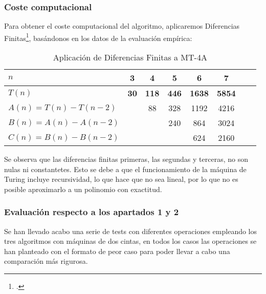 \subsubsection*{Coste computacional}
Para obtener el coste computacional del algoritmo, aplicaremos Diferencias Finitas\footcite[ver][pgs. 1-42: \textit{Chapter 1. Difference Tables and Polynomial Fits}]{cuoco2005mathematical}, basándonos en los datos de la evaluación empírica:

\begin{table}[H]
    \centering
    \begin{tabular}{|l|c|c|c|c|c|c|c|}
        \hline
        $n$ & \textbf{3} & \textbf{4} & \textbf{5} & \textbf{6} & \textbf{7}\\ \hline
        $T(n)$ & \textbf{30} & \textbf{118} & \textbf{446} & \textbf{1638} & \textbf{5854}      \\ \hline
        \hline
        $A(n) = T(n) - T(n-2)$ &    & 88 & 328 & 1192 & 4216 \\ \hline
        $B(n) = A(n) - A(n-2)$ &    &   & 240 & 864 & 3024 \\ \hline
        $C(n) = B(n) - B(n-2)$ &    &   &    & 624 & 2160 \\ \hline
    \end{tabular}
    \caption{Aplicación de Diferencias Finitas a MT-4A}
\end{table}

Se observa que las diferencias finitas primeras, las segundas y terceras, no son nulas ni constantetes. Esto se debe a que el funcionamiento de la máquina de Turing incluye recursividad, lo que hace que no sea lineal, por lo que no es posible aproximarlo a un polinomio con exactitud.\medskip


\subsubsection*{Evaluación respecto a los apartados 1 y 2}
Se han llevado acabo una serie de tests con diferentes operaciones empleando los tres algoritmos con máquinas de dos cintas, en todos los casos las operaciones se han planteado con el formato de peor caso para poder llevar a cabo una comparación más rigurosa.

